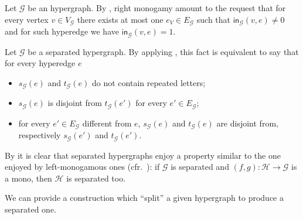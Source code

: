 \documentclass[3p]{elsarticle}
\newcommand{\ind}[1]{\mathsf{in}_{\mathcal{#1}}}
\theoremstyle{remark}
\theoremstyle{definition}
\begin{document}
\begin{rem} Let $\mathcal{G}$ be an hypergraph. By , right monogamy amount to the request that for every vertex $v\in V_{\mathcal{G}}$ there exists at most one $e_V\in E_{\mathcal{G}}$ such that $\ind{G}(v, e) \neq 0$ and  for such hyperedge we have $\ind{G}(v,e)=1$.
 \end{rem}
 
 \begin{rem}\label{rem:elem2}
 	Let $\mathcal{G}$ be a separated hypergraph.
 	By applying , this fact is equivalent to say that for every hyperedge $e$
 	\begin{itemize}
 		\item $s_{\mathcal{G}}(e)$ and $t_{\mathcal{G}}(e)$ do not contain repeated letters;
 		\item $s_{\mathcal{G}}(e)$ is disjoint from $t_{\mathcal{G}}(e')$ for every $e'\in E_{\mathcal{G}}$;
 		\item for every $e'\in E_{\mathcal{G}}$ different from $e$, $s_{\mathcal{G}}(e)$ and $t_{\mathcal{G}}(e)$ are disjoint from, respectively $s_{\mathcal{G}}(e')$ and $t_{\mathcal{G}}(e')$.
 	\end{itemize}
 \end{rem}
 
 \begin{rem}\label{rem:count}
 	By  it is clear that separated hypergraphs enjoy a property similar to the one enjoyed by left-monogamous ones (cfr.~): if $\mathcal{G}$ is separated and $(f,g)\colon \mathcal{H}\to \mathcal{G}$ is a mono, then $\mathcal{H}$ is separated too.
 \end{rem}

We can provide a construction which ``split'' a given hypergraph to produce a separated one.
\end{document}
